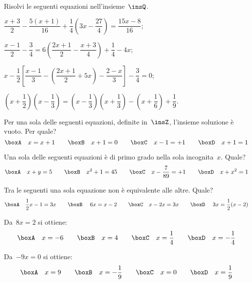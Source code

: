 \pagebreak

\begin{esercizio}[\Ast] %
\label{ese:15.43}
Risolvi le seguenti equazioni nell'insieme~$\insQ$.
\begin{enumeratea}
 \item $\dfrac{x+3}{2}-\dfrac{5(x+1)}{16}+\dfrac{1}{4}\left(3x-\dfrac{27}{4}\right)=\dfrac{15x-8}{16}$;
 \item $\dfrac{x-1}{2}-\dfrac{3}{4}=6\left(\dfrac{2x+1}{2}-\dfrac{x+3}{4}\right)+\dfrac{1}{4}-4x$;
 \item $x-\dfrac{1}{2}\left[\dfrac{x-1}{3}-\left(\dfrac{2x+1}{2}+5x\right)-\dfrac{2-x}{3}\right]-\dfrac{3}{4}=0$;
 \item $\left(x+\dfrac{1}{2}\right)\left(x-\dfrac{1}{3}\right)=\left(x-\dfrac{1}{3}\right)\left(x+\dfrac{1}{3}\right)-\left(x+\dfrac{1}{6}\right)+\dfrac{1}{9}$.
\end{enumeratea}
\end{esercizio}

\begin{esercizio}
\label{ese:15.44}
Per una sola delle seguenti equazioni, definite in~$\insZ$, l'insieme soluzione è vuoto. Per quale?
\[\boxA\quad x=x+1\qquad\boxB\quad x+1=0\qquad\boxC\quad x-1=+1\qquad\boxD\quad x+1=1\]
\end{esercizio}

\begin{esercizio}
\label{ese:15.45}
Una sola delle seguenti equazioni è di primo grado nella sola incognita~$x$. Quale?
\[\boxA\quad x+y=5\qquad\boxB\quad x^{2}+1=45\qquad\boxC\quad x-\dfrac{7}{89}=+1\qquad\boxD\quad x+x^{2}=1\]
\end{esercizio}

\begin{esercizio}
\label{ese:15.46}
Tra le seguenti una sola equazione non è equivalente alle altre. Quale?
\[\boxA\quad \dfrac{1}{2}x-1=3x\qquad\boxB\quad~6x=x-2\qquad\boxC\quad x-2x=3x\qquad\boxD\quad~3x=\dfrac{1}{2}(x-2)\]
\end{esercizio}

\begin{esercizio}
\label{ese:15.47}
Da~$8x=2$ si ottiene:
\[\boxA\quad x=-6\qquad\boxB\quad x=4\qquad\boxC\quad x=\dfrac{1}{4}\qquad\boxD\quad x=-{\dfrac{1}{4}}\]
\end{esercizio}

\begin{esercizio}
\label{ese:15.48}
Da~$-9x=0$ si ottiene:
\[\boxA\quad x=9\qquad\boxB\quad x=-{\dfrac{1}{9}}\qquad\boxC\quad x=0\qquad\boxD\quad x=\dfrac{1}{9}\]
\end{esercizio}

